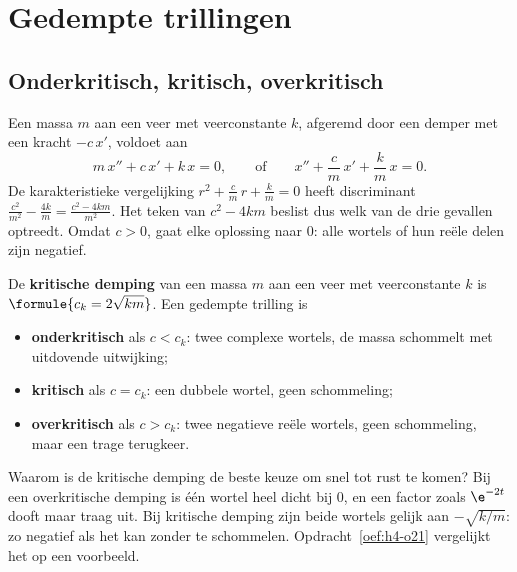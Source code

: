 \section{Gedempte trillingen}

\subsection{Onderkritisch, kritisch, overkritisch}

Een massa $m$ aan een veer met veerconstante $k$, afgeremd door een demper met een kracht $-c\,x'$, voldoet aan
\[
m\,x'' + c\,x' + k\,x = 0 , \qquad \text{of} \qquad x'' + \frac cm\,x' + \frac km\,x = 0 .
\]
De karakteristieke vergelijking $r^2 + \tfrac cm\,r + \tfrac km = 0$ heeft discriminant $\tfrac{c^2}{m^2} - \tfrac{4k}{m} = \tfrac{c^2 - 4km}{m^2}$. Het teken van $c^2 - 4km$ beslist dus welk van de drie gevallen optreedt. Omdat $c > 0$, gaat elke oplossing naar 0: alle wortels of hun reële delen zijn negatief.

\begin{theorie}
De \textbf{\textcolor{accent}{kritische demping}} van een massa $m$ aan een veer met veerconstante $k$ is $\formule{c_k = 2\sqrt{km}}$. Een gedempte trilling is
\begin{itemize}
\item \textbf{\textcolor{accent}{onderkritisch}} als $c < c_k$: twee complexe wortels, de massa schommelt met uitdovende uitwijking;
\item \textbf{\textcolor{accent}{kritisch}} als $c = c_k$: een dubbele wortel, geen schommeling;
\item \textbf{\textcolor{accent}{overkritisch}} als $c > c_k$: twee negatieve reële wortels, geen schommeling, maar een trage terugkeer.
\end{itemize}
\end{theorie}

Waarom is de kritische demping de beste keuze om snel tot rust te komen? Bij een overkritische demping is één wortel heel dicht bij 0, en een factor zoals $\e^{-2t}$ dooft maar traag uit. Bij kritische demping zijn beide wortels gelijk aan $-\sqrt{k/m}$: zo negatief als het kan zonder te schommelen. Opdracht~\ref{oef:h4-o21} vergelijkt het op een voorbeeld.


